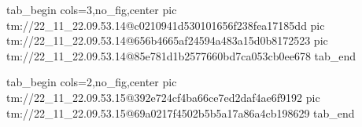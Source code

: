  
 
 
 
 

\qqSecCmtScr


\ifcmt
  tab_begin cols=3,no_fig,center
    pic tm://22_11_22.09.53.14@c0210941d530101656f238fea17185dd
    pic tm://22_11_22.09.53.14@656b4665af24594a483a15d0b8172523
    pic tm://22_11_22.09.53.14@85e781d1b2577660bd7ca053cb0ee678
  tab_end
\fi


\ifcmt
  tab_begin cols=2,no_fig,center
    pic tm://22_11_22.09.53.15@392e724cf4ba66ce7ed2daf4ae6f9192
    pic tm://22_11_22.09.53.15@69a0217f4502b5b5a17a86a4cb198629
  tab_end
\fi

